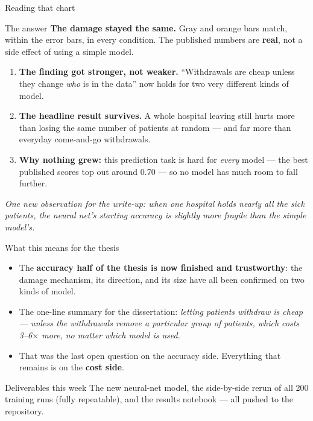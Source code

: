 \documentclass[aspectratio=169]{beamer}
\begin{document}
\begin{frame}{Reading that chart}
\begin{alertblock}{The answer}
\textbf{The damage stayed the same.} Gray and orange bars match, within the error bars,
in every condition. The published numbers are \textbf{real}, not a side effect of using
a simple model.
\end{alertblock}
\vfill
\begin{enumerate}
\item \textbf{The finding got stronger, not weaker.} ``Withdrawals are cheap unless they
      change \emph{who} is in the data'' now holds for two very different kinds of model.
\item \textbf{The headline result survives.} A whole hospital leaving still hurts more
      than losing the same number of patients at random --- and far more than everyday
      come-and-go withdrawals.
\item \textbf{Why nothing grew:} this prediction task is hard for \emph{every} model ---
      the best published scores top out around 0.70 --- so no model has much room
      to fall further.
\end{enumerate}
\vfill
{\footnotesize\textit{One new observation for the write-up: when one hospital holds nearly
all the sick patients, the neural net's starting accuracy is slightly more fragile than
the simple model's.}}
\end{frame}

\begin{frame}{What this means for the thesis}
\begin{itemize}
\item The \textbf{accuracy half of the thesis is now finished and trustworthy}: the
      damage mechanism, its direction, and its size have all been confirmed on two
      kinds of model.
\item The one-line summary for the dissertation: \emph{letting patients withdraw is
      cheap --- unless the withdrawals remove a particular group of patients, which
      costs 3--6$\times$ more, no matter which model is used.}
\item That was the last open question on the accuracy side. Everything that remains
      is on the \textbf{cost side}.
\end{itemize}
\vfill
\begin{block}{Deliverables this week}
The new neural-net model, the side-by-side rerun of all 200 training runs (fully
repeatable), and the results notebook --- all pushed to the repository.
\end{block}
\end{frame}
\end{document}
